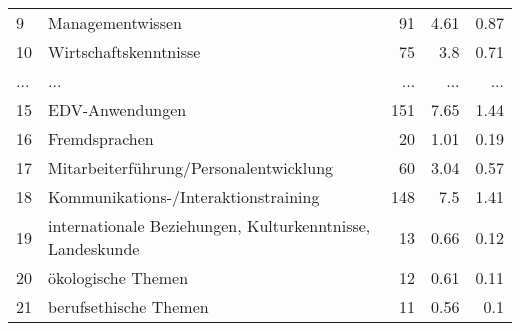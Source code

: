\begin{longtable}{lXrrr}
        9 & \multicolumn{1}{X}{Managementwissen} & %
          \num{91} &
          \num[round-mode=places,round-precision=2]{4,61} &
          \num[round-mode=places,round-precision=2]{0,87} \\
        10 & \multicolumn{1}{X}{Wirtschaftskenntnisse} & %
          \num{75} &
          \num[round-mode=places,round-precision=2]{3,8} &
          \num[round-mode=places,round-precision=2]{0,71} \\
       ... & ... & ... & ... & ... \\
        15 & \multicolumn{1}{X}{EDV-Anwendungen} & %
          \num{151} &
          \num[round-mode=places,round-precision=2]{7,65} &
          \num[round-mode=places,round-precision=2]{1,44} \\

        16 & \multicolumn{1}{X}{Fremdsprachen} & %
          \num{20} &
          \num[round-mode=places,round-precision=2]{1,01} &
          \num[round-mode=places,round-precision=2]{0,19} \\

        17 & \multicolumn{1}{X}{Mitarbeiterführung/Personalentwicklung} & %
          \num{60} &
          \num[round-mode=places,round-precision=2]{3,04} &
          \num[round-mode=places,round-precision=2]{0,57} \\

        18 & \multicolumn{1}{X}{Kommunikations-/Interaktionstraining} & %
          \num{148} &
          \num[round-mode=places,round-precision=2]{7,5} &
          \num[round-mode=places,round-precision=2]{1,41} \\

        19 & \multicolumn{1}{X}{internationale Beziehungen, Kulturkenntnisse, Landeskunde} & %
          \num{13} &
          \num[round-mode=places,round-precision=2]{0,66} &
          \num[round-mode=places,round-precision=2]{0,12} \\

        20 & \multicolumn{1}{X}{ökologische Themen} & %
          \num{12} &
          \num[round-mode=places,round-precision=2]{0,61} &
          \num[round-mode=places,round-precision=2]{0,11} \\

        21 & \multicolumn{1}{X}{berufsethische Themen} & %
          \num{11} &
          \num[round-mode=places,round-precision=2]{0,56} &
          \num[round-mode=places,round-precision=2]{0,1} \\


\end{longtable}
